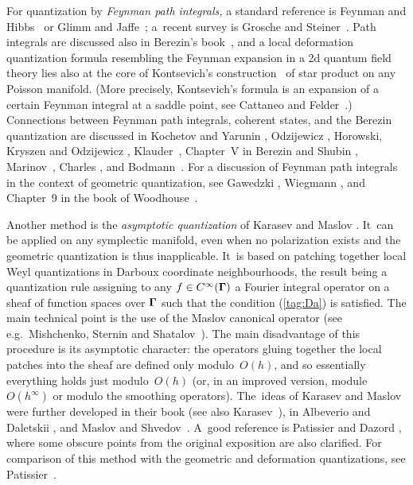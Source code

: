 \documentclass[11pt]{amsart}
\numberwithin{equation}{section}
\theoremstyle{remark}
\newcommand\Omg{{\bigam}}   %
\newcommand{\bigam}{\mbox{\boldmath $\Gamma$}}
\begin{document}
For quantization by {\sl Feynman path integrals,\/} a standard reference is
Feynman and Hibbs~\cite{bib:FeyH} or Glimm and Jaffe~\cite{bib:Jaffe}; a~recent
survey is Grosche and Steiner~\cite{bib:Grosche}. Path integrals
are discussed also in Berezin's book~\cite{bib:BerBk}, and a local deformation
quantization formula resembling the Feynman expansion in a 2d quantum field
theory lies also at the core of Kontsevich's construction~\cite{bib:Kon} of
star product on any Poisson manifold. (More precisely, Kontsevich's formula is
an expansion of a certain Feynman integral at a saddle point, see Cattaneo and
Felder~\cite{bib:CattFeld}.) Connections between Feynman path integrals,
coherent states, and the Berezin quantization are discussed in Kochetov and
Yarunin \cite{bib:KoYar}, Odzijewicz \cite{bib:OdziB}, Horowski, Kryszen and
Odzijewicz  \cite{bib:OdziC}, Klauder~\cite{bib:Klaud}, Chapter~V in Berezin
and Shubin \cite{bib:+BerShu}, Marinov~\cite{bib:MarinB}, Charles
\cite{bib:+Charl}, and Bodmann~\cite{bib:Bodm}. For a discussion of
Feynman path integrals in the context of geometric quantization, see Gawedzki
\cite{bib:GaweF}, Wiegmann \cite{bib:Weigh}, and Chapter~9 in the book of
Woodhouse~\cite{bib:Woodh}.

Another method is the {\sl asymptotic quantization\/} of Karasev and Maslov
\cite{bib:KMab}. It~can be applied on any symplectic manifold, even when no
polarization exists and the geometric quantization is thus inapplicable. It~is
based on patching together local Weyl quantizations in Darboux coordinate
neighbourhoods, the result being a quantization rule assigning to any $f\in
C^\infty(\Omg)$ a Fourier integral operator on a sheaf of function spaces
over $\Omg$ such that the condition (\ref{tag:Da}) is satisfied. The main
technical point is the use of the Maslov canonical operator (see
e.g.~Mishchenko, Sternin and Shatalov~\cite{bib:Mis}). The main disadvantage of
this procedure is its asymptotic character: the operators gluing together the
local patches into the sheaf are defined only modulo~$O(h)$, and so essentially
everything holds just modulo~$O(h)$ (or, in an improved version, module
$O(h^\infty)$ or modulo the smoothing operators). The~ideas of Karasev and
Maslov were further developed in their book \cite{bib:KMbk} (see also
Karasev~\cite{bib:Karax}), in Albeverio and Daletskii \cite{bib:AlbD}, and
Maslov and Shvedov~\cite{bib:MaslSh}. A~good reference is Patissier and Dazord
\cite{bib:PatDa}, where some obscure points from the original exposition
\cite{bib:KMab} are also clarified. For comparison of this method with the
geometric and deformation quantizations, see Patissier~\cite{bib:Patis}.
\end{document}
